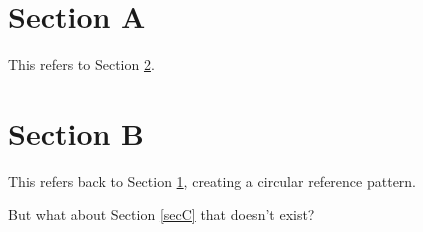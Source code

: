 \documentclass{article}
\begin{document}
\section{Section A}\label{secA}
This refers to Section \ref{secB}.

\section{Section B}\label{secB}
This refers back to Section \ref{secA}, creating a circular reference pattern.

But what about Section \ref{secC} that doesn't exist?
\end{document}
